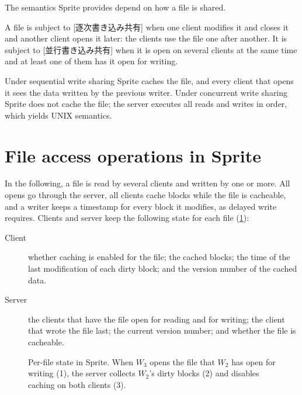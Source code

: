\documentclass[../main.tex]{subfiles}
\begin{document}
The semantics Sprite provides depend on how a file is shared.

\begin{definition}
  A file is subject to
  [逐次書き込み共有] when one client
  modifies it and closes it and another client opens it later: the clients
  use the file one after another.  It is subject to
  [並行書き込み共有] when it is open on
  several clients at the same time and at least one of them has it open for
  writing.
\end{definition}

Under sequential write sharing Sprite caches the file, and every client
that opens it sees the data written by the previous writer.  Under
concurrent write sharing Sprite does not cache the file; the server
executes all reads and writes in order, which yields UNIX semantics.

\section{File access operations in Sprite}
\label{sec:l14-sprite-ops}

In the following, a file is read by several clients and written by one or
more.  All opens go through the server, all clients cache
blocks while the file is cacheable, and a writer keeps a timestamp for
every block it modifies, as delayed write requires.  Clients and server
keep the following state for each file (\cref{fig:l14-sprite}):
\begin{description}
  \item[Client] whether caching is enabled for the file; the cached blocks;
    the time of the last modification of each dirty block; and the version
    number of the cached data.
  \item[Server] the clients that have the file open for reading and for
    writing; the client that wrote the file last; the current version
    number; and whether the file is cacheable.
\end{description}

\begin{figure}[htbp]
  \centering
  
  \caption{Per-file state in Sprite.  When $W_3$ opens the file that $W_2$
    has open for writing (1), the server collects $W_2$'s dirty blocks (2)
    and disables caching on both clients (3).}
  \label{fig:l14-sprite}
\end{figure}
\end{document}
